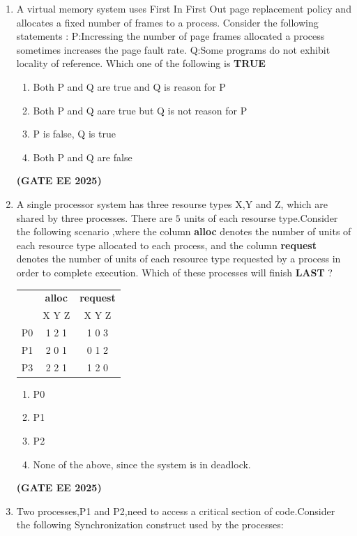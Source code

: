 \documentclass[journal,12pt,onecolumn]{IEEEtran}
\theoremstyle{remark}
\begin{document}
\begin{enumerate}
\item A virtual memory system uses First In First Out  page replacement policy and allocates a fixed number of frames to a process. Consider the following statements :
\newline 
P:Incressing the number of page frames allocated a  process sometimes increases the page fault rate.
\newline
Q:Some programs do not exhibit locality of reference.
\newline
Which one of the following is \textbf{TRUE}
\begin{enumerate}
    \item Both P and Q are true and Q is reason for  P
    \item Both P and Q aare true but Q is not reason for P
    \item P is false, Q is true 
    \item Both P and Q are false
\end{enumerate}
\hfill \textbf{(GATE EE 2025)}
\item A single processor system has three resourse types X,Y and Z, which are shared by three processes. There are $5$ units of each resourse type.Consider the following scenario ,where the column \textbf{alloc } denotes the number of units of each resource  type allocated to each process, and the column \textbf{request} denotes the number of units of each resource type requested by a process in order to complete execution. Which of these processes will finish  \textbf{LAST} ?
\newline
\begin{tabular}{|c c c| }
\hline
        & \textbf{alloc} & \textbf{request} \\
          & X Y Z & X Y Z \\
       P0 &  1 2 1 & 1 0 3\\
       P1 & 2 0 1 &  0 1 2 \\
       P3 & 2 2 1 & 1 2 0 \\
       \hline
\end{tabular}
\begin{enumerate}
    \item P0
    \item P1
    \item P2
    \item None of the above, since the system is in deadlock.
\end{enumerate}
\hfill \textbf{(GATE EE 2025)}
\item  Two processes,P1 and P2,need to access a critical section of code.Consider the following Synchronization construct used by the processes:
\newline


\end{enumerate}
\end{document}

